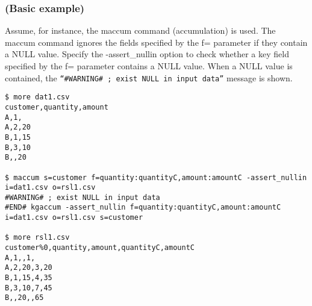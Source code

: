 \subsubsection*{(Basic example) }
Assume, for instance, the maccum command (accumulation) is used. The maccum command ignores the fields specified by the f= parameter if they contain a NULL value. Specify the -assert\_nullin option to check whether a key field specified by the f= parameter contains a NULL value. When a NULL value is contained, the \verb|“#WARNING# ; exist NULL in input data”| message is shown.

\begin{Verbatim}[baselinestretch=0.7,frame=single]
$ more dat1.csv
customer,quantity,amount
A,1,
A,2,20
B,1,15
B,3,10
B,,20

$ maccum s=customer f=quantity:quantityC,amount:amountC -assert_nullin i=dat1.csv o=rsl1.csv
#WARNING# ; exist NULL in input data
#END# kgaccum -assert_nullin f=quantity:quantityC,amount:amountC i=dat1.csv o=rsl1.csv s=customer

$ more rsl1.csv
customer%0,quantity,amount,quantityC,amountC
A,1,,1,
A,2,20,3,20
B,1,15,4,35
B,3,10,7,45
B,,20,,65
\end{Verbatim}
